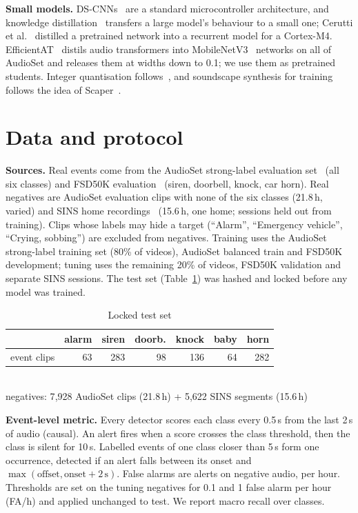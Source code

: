 \documentclass[conference]{IEEEtran}
\begin{document}
\textbf{Small models.} DS-CNNs~\cite{dscnn} are a standard microcontroller architecture, and
knowledge distillation~\cite{kd} transfers a large model's behaviour to a small one; Cerutti et
al.~\cite{cerutti} distilled a pretrained network into a recurrent model for a Cortex-M4.
EfficientAT~\cite{efficientat} distils audio transformers into MobileNetV3~\cite{mobilenetv3}
networks on all of AudioSet and releases them at widths down to 0.1; we use them as pretrained
students. Integer quantisation follows~\cite{jacob}, and soundscape synthesis for training
follows the idea of Scaper~\cite{scaper}.

\section{Data and protocol}
\textbf{Sources.} Real events come from the AudioSet strong-label evaluation set~\cite{audioset,strong}
(all six classes) and FSD50K evaluation~\cite{fsd50k} (siren, doorbell, knock, car horn). Real
negatives are AudioSet evaluation clips with none of the six classes (21.8\,h, varied) and SINS
home recordings~\cite{sins} (15.6\,h, one home; sessions held out from training). Clips whose
labels may hide a target (``Alarm'', ``Emergency vehicle'', ``Crying, sobbing'') are excluded
from negatives. Training uses the AudioSet strong-label training set (80\% of videos), AudioSet
balanced train and FSD50K development; tuning uses the remaining 20\% of videos, FSD50K
validation and separate SINS sessions. The test set (Table~\ref{tab:data}) was hashed and locked
before any model was trained.

\begin{table}[t]\centering\caption{Locked test set}\label{tab:data}
\begin{tabular}{lrrrrrr}\toprule
 & alarm & siren & doorb. & knock & baby & horn \\ \midrule
event clips & 63 & 283 & 98 & 136 & 64 & 282 \\ \bottomrule
\end{tabular}\\[2pt]
\footnotesize negatives: 7{,}928 AudioSet clips (21.8\,h) + 5{,}622 SINS segments (15.6\,h)
\end{table}

\textbf{Event-level metric.} Every detector scores each class every 0.5\,s from the last 2\,s of
audio (causal). An alert fires when a score crosses the class threshold, then the class is silent
for 10\,s. Labelled events of one class closer than 5\,s form one occurrence, detected if an
alert falls between its onset and $\max(\text{offset}, \text{onset}+2\,\text{s})$. False alarms
are alerts on negative audio, per hour. Thresholds are set on the tuning negatives for 0.1 and
1 false alarm per hour (FA/h) and applied unchanged to test. We report macro recall over classes.
\end{document}
